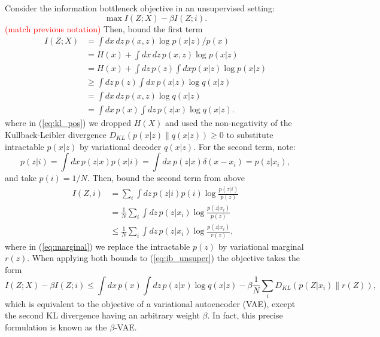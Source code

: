 \documentclass[11pt]{article}
\newcommand\myworries[1]{\textcolor{red}{(#1)}}
\begin{document}
Consider the information bottleneck objective in an unsupervised setting:
\begin{equation}
\max I(Z;X) - \beta I(Z;i).
\label{eq:ib_unsuper}
\end{equation}
\myworries{match previous notation}
Then, bound the first term
\begin{align}
I(Z;X) 
&= \int dx\,dz\,p(x,z) \log p(x|z)/p(x) \\
&= H(x) + \int dx\,dz\,p(x,z) \log p(x|z)  \\
&= H(x) + \int dz\,p(z) \int dx p(x|z) \log p(x|z)  \\
&\geq \int dz\,p(z) \int dx\,p(x|z) \log q(x|z) \label{eq:kl_pos} \\
&= \int dx\,dz\,p(x,z) \log q(x|z)  \\
&= \int dx\,p(x) \int dz\,p(z|x) \log q(x|z).
\end{align}
where in (\ref{eq:kl_pos}) we dropped $H(X)$ and used the non-negativity of the Kullback-Leibler divergence $D_{KL}(p(x\vert z)\rVert q(x\vert z)) \geq 0$ to substitute intractable $p(x\vert z)$ by variational decoder $q(x\vert z)$.
For the second term, note:
\begin{equation}
p(z\vert i) = \int dx\,p(z\vert x)p(x\vert i) = \int dx\,p(z\vert x)\delta(x-x_i) = p(z\vert x_i),
\end{equation}
and take $p(i) = 1/N.$
Then, bound the second term from above
\begin{align}
I(Z,i)
&= \sum_i\int dz\,p(z\vert i)p(i)\log\frac{p(z\vert i)}{p(z)}\\
&= \frac{1}{N} \sum_i\int dz\, p(z\vert x_i)\log\frac{p(z\vert x_i)}{p(z)}\\
&\leq \frac{1}{N} \sum_i\int dz\, p(z\vert x_i) \log\frac{p(z\vert x_i)}{r(z)}\label{eq:marginal},
\end{align}
where in (\ref{eq:marginal}) we replace the intractable $p(z)$ by variational marginal $r(z)$.
When applying both bounds to (\ref{eq:ib_unsuper}) the objective takes the form
\begin{equation}
I(Z;X) - \beta I(Z;i) \leq \int dx\,p(x)\int dz\, p(z\vert x) \log q(x\vert z) - \beta \frac{1}{N} \sum_i D_{KL}(p(Z\vert x_i)\rVert r(Z)),
\end{equation}
which is equivalent to the objective of a variational autoencoder (VAE), except the second KL divergence having an arbitrary weight $\beta$. In fact, this precise formulation is known as the $\beta$-VAE.
\end{document}
